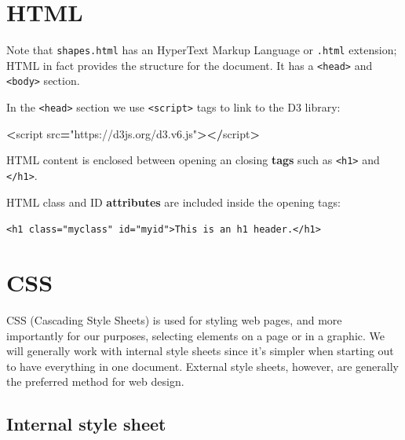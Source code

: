 \documentclass[
  openany]{book}
\newenvironment{Shaded}{\begin{snugshade}}{\end{snugshade}}
\newcommand{\NormalTok}[1]{#1}
\newcommand{\OperatorTok}[1]{\textcolor[rgb]{0.81,0.36,0.00}{\textbf{#1}}}
\newcommand{\StringTok}[1]{\textcolor[rgb]{0.31,0.60,0.02}{#1}}
\begin{document}
\hypertarget{html}{%
\section{\texorpdfstring{HTML }{HTML }}\label{html}}

Note that \texttt{shapes.html} has an HyperText Markup Language or \texttt{.html} extension; HTML in fact provides the structure for the document. It has a \texttt{\textless{}head\textgreater{}} and \texttt{\textless{}body\textgreater{}} section.

In the \texttt{\textless{}head\textgreater{}} section we use \texttt{\textless{}script\textgreater{}} tags to link to the D3 library:

\begin{Shaded}
\begin{Highlighting}[]
\OperatorTok{\textless{}}\NormalTok{script src}\OperatorTok{=}\StringTok{"https://d3js.org/d3.v6.js"}\OperatorTok{\textgreater{}\textless{}/}\NormalTok{script}\OperatorTok{\textgreater{}}
\end{Highlighting}
\end{Shaded}

HTML content is enclosed between opening an closing \textbf{tags} such as \texttt{\textless{}h1\textgreater{}} and \texttt{\textless{}/h1\textgreater{}}.

HTML class and ID \textbf{attributes} are included inside the opening tags:

\texttt{\textless{}h1\ class="myclass"\ id="myid"\textgreater{}This\ is\ an\ h1\ header.\textless{}/h1\textgreater{}}

\hypertarget{css}{%
\section{\texorpdfstring{CSS }{CSS }}\label{css}}

CSS (Cascading Style Sheets) is used for styling web pages, and more importantly for our purposes, selecting elements on a page or in a graphic. We will generally work with internal style sheets since it's simpler when starting out to have everything in one document. External style sheets, however, are generally the preferred method for web design.

\hypertarget{internal-style-sheet}{%
\subsection{Internal style sheet}\label{internal-style-sheet}}
\end{document}
